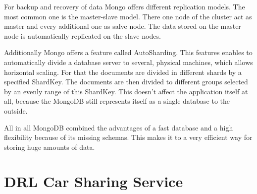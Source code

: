 
For backup and recovery of data Mongo offers different replication models. The most common one is the master-slave model. There one node of the cluster act as master and every additional one as salve node. The data stored on the master node is automatically replicated on the slave nodes.

Additionally Mongo offers a feature called AutoSharding. This features enables to automatically divide a database server to several, physical machines, which allows horizontal scaling. For that the documents are divided in different shards by a specified ShardKey. The documents are then divided to different groups selected by an evenly range of this ShardKey. This doesn't affect the application itself at all, because the MongoDB still represents itself as a single database to the outside.

All in all MongoDB combined the advantages of a fast database and a high flexibility because of its missing schemas. This makes it to a very efficient way for storing huge amounts of data.

\section{DRL Car Sharing Service}


